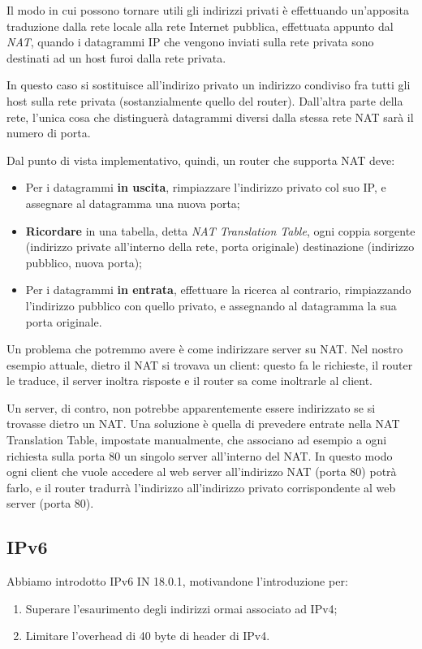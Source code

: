 \documentclass[a4paper,11pt]{article}
\begin{document}
Il modo in cui possono tornare utili gli indirizzi privati è effettuando un'apposita traduzione dalla rete locale alla rete Internet pubblica, effettuata appunto dal \textit{NAT}, quando i datagrammi IP che vengono inviati sulla rete privata sono destinati ad un host furoi dalla rete privata.

In questo caso si sostituisce all'indirizo privato un indirizzo condiviso fra tutti gli host sulla rete privata (sostanzialmente quello del router).
Dall'altra parte della rete, l'unica cosa che distinguerà datagrammi diversi dalla stessa rete NAT sarà il numero di porta.

Dal punto di vista implementativo, quindi, un router che supporta NAT deve:
\begin{itemize}
	\item Per i datagrammi \textbf{in uscita}, rimpiazzare l'indirizzo privato col suo IP, e assegnare al datagramma una nuova porta;
	\item \textbf{Ricordare} in una tabella, detta \textit{NAT Translation Table}, ogni coppia sorgente (indirizzo private all'interno della rete, porta originale) destinazione (indirizzo pubblico, nuova porta);
	\item Per i datagrammi \textbf{in entrata}, effettuare la ricerca al contrario, rimpiazzando l'indirizzo pubblico con quello privato, e assegnando al datagramma la sua porta originale.
\end{itemize}

Un problema che potremmo avere è come indirizzare server su NAT.
Nel nostro esempio attuale, dietro il NAT si trovava un client: questo fa le richieste, il router le traduce, il server inoltra risposte e il router sa come inoltrarle al client.

Un server, di contro, non potrebbe apparentemente essere indirizzato se si trovasse dietro un NAT. 
Una soluzione è quella di prevedere entrate nella NAT Translation Table, impostate manualmente, che associano ad esempio a ogni richiesta sulla porta 80 un singolo server all'interno del NAT.
In questo modo ogni client che vuole accedere al web server all'indirizzo NAT (porta 80) potrà farlo, e il router tradurrà l'indirizzo all'indirizzo privato corrispondente al web server (porta 80).

\subsection{IPv6}
Abbiamo introdotto IPv6 IN 18.0.1, motivandone l'introduzione per:
\begin{enumerate}
	\item Superare l'esaurimento degli indirizzi ormai associato ad IPv4;
	\item Limitare l'overhead di 40 byte di header di IPv4.
\end{enumerate}
\end{document}
